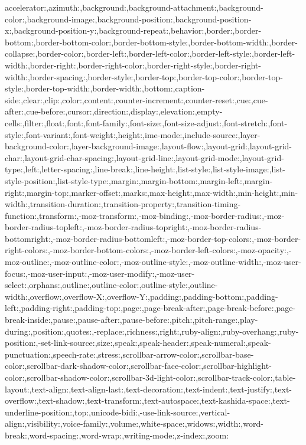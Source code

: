 {{		accelerator:,azimuth:,background:,background-attachment:,background-color:,background-image:,background-position:,background-position-x:,background-position-y:,background-repeat:,behavior:,border:,border-bottom:,border-bottom-color:,border-bottom-style:,border-bottom-width:,border-collapse:,border-color:,border-left:,border-left-color:,border-left-style:,border-left-width:,border-right:,border-right-color:,border-right-style:,border-right-width:,border-spacing:,border-style:,border-top:,border-top-color:,border-top-style:,border-top-width:,border-width:,bottom:,caption-side:,clear:,clip:,color:,content:,counter-increment:,counter-reset:,cue:,cue-after:,cue-before:,cursor:,direction:,display:,elevation:,empty-cells:,filter:,float:,font:,font-family:,font-size:,font-size-adjust:,font-stretch:,font-style:,font-variant:,font-weight:,height:,ime-mode:,include-source:,layer-background-color:,layer-background-image:,layout-flow:,layout-grid:,layout-grid-char:,layout-grid-char-spacing:,layout-grid-line:,layout-grid-mode:,layout-grid-type:,left:,letter-spacing:,line-break:,line-height:,list-style:,list-style-image:,list-style-position:,list-style-type:,margin:,margin-bottom:,margin-left:,margin-right:,margin-top:,marker-offset:,marks:,max-height:,max-width:,min-height:,min-width:,transition-duration:,transition-property:,transition-timing-function:,transform:,-moz-transform:,-moz-binding:,-moz-border-radius:,-moz-border-radius-topleft:,-moz-border-radius-topright:,-moz-border-radius-bottomright:,-moz-border-radius-bottomleft:,-moz-border-top-colors:,-moz-border-right-colors:,-moz-border-bottom-colors:,-moz-border-left-colors:,-moz-opacity:,-moz-outline:,-moz-outline-color:,-moz-outline-style:,-moz-outline-width:,-moz-user-focus:,-moz-user-input:,-moz-user-modify:,-moz-user-select:,orphans:,outline:,outline-color:,outline-style:,outline-width:,overflow:,overflow-X:,overflow-Y:,padding:,padding-bottom:,padding-left:,padding-right:,padding-top:,page:,page-break-after:,page-break-before:,page-break-inside:,pause:,pause-after:,pause-before:,pitch:,pitch-range:,play-during:,position:,quotes:,-replace:,richness:,right:,ruby-align:,ruby-overhang:,ruby-position:,-set-link-source:,size:,speak:,speak-header:,speak-numeral:,speak-punctuation:,speech-rate:,stress:,scrollbar-arrow-color:,scrollbar-base-color:,scrollbar-dark-shadow-color:,scrollbar-face-color:,scrollbar-highlight-color:,scrollbar-shadow-color:,scrollbar-3d-light-color:,scrollbar-track-color:,table-layout:,text-align:,text-align-last:,text-decoration:,text-indent:,text-justify:,text-overflow:,text-shadow:,text-transform:,text-autospace:,text-kashida-space:,text-underline-position:,top:,unicode-bidi:,-use-link-source:,vertical-align:,visibility:,voice-family:,volume:,white-space:,widows:,width:,word-break:,word-spacing:,word-wrap:,writing-mode:,z-index:,zoom:
}}
